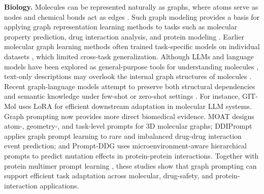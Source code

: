 \textbf{Biology. }Molecules can be represented naturally as graphs, where atoms serve as nodes and chemical bonds act as edges \cite{rong2020selfsupervised}. Such graph modeling provides a basis for applying graph representation learning methods to tasks such as molecular property prediction, drug interaction analysis, and protein modeling \cite{rong2020selfsupervised, liu2023molca, zhao2023gimlet, edwards2023synergpt}. Earlier molecular graph learning methods often trained task-specific models on individual datasets \cite{rong2020selfsupervised, sun2020infograph}, which limited cross-task generalization. Although LLMs and language models have been explored as general-purpose tools for understanding molecules \cite{qian2023can, liu2023one}, text-only descriptions may overlook the internal graph structures of molecules \cite{zhang2023large}. Recent graph-language models attempt to preserve both structural dependencies and semantic knowledge under few-shot or zero-shot settings \cite{zhao2023gimlet, edwards2023synergpt}. For instance, GIT-Mol \cite{liu2023gitmol} uses LoRA \cite{hu2021lora} for efficient downstream adaptation in molecular LLM systems. Graph prompting now provides more direct biomedical evidence. MOAT \cite{long2024moat} designs atom-, geometry-, and task-level prompts for 3D molecular graphs; DDIPrompt \cite{wang2024ddiprompt} applies graph prompt learning to rare and imbalanced drug-drug interaction event prediction; and Prompt-DDG \cite{wu2024promptddg} uses microenvironment-aware hierarchical prompts to predict mutation effects in protein-protein interactions. Together with protein multimer prompt learning \cite{gao2024protein}, these studies show that graph prompting can support efficient task adaptation across molecular, drug-safety, and protein-interaction applications.


